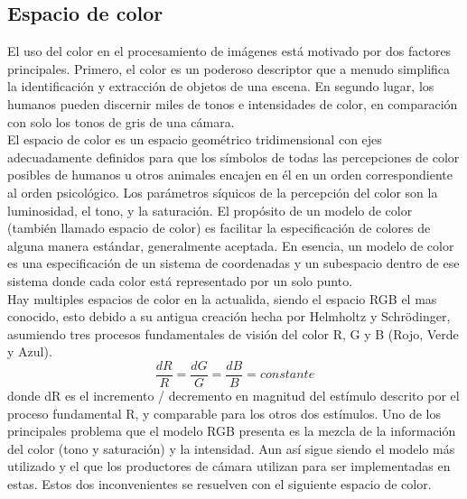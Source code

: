 \subsection{Espacio de color}
El uso del color en el procesamiento de imágenes está motivado por dos factores principales.
Primero, el color es un poderoso descriptor que a menudo simplifica la identificación y
extracción de objetos de una escena. En segundo lugar, los humanos pueden discernir miles
de tonos e intensidades de color, en comparación con solo los tonos de gris de una cámara.\cite{Book:Rafael2002}\\
El espacio de color es un espacio geométrico tridimensional con ejes adecuadamente
definidos para que los símbolos de todas las percepciones de color posibles de humanos u
otros animales encajen en él en un orden correspondiente al orden psicológico.
Los parámetros síquicos de la percepción del color son la luminosidad, el tono, y
la saturación. El propósito de un modelo de color (también llamado espacio de color) es
facilitar la especificación de colores de alguna manera estándar, generalmente aceptada.
En esencia, un modelo de color es una especificación de un sistema de coordenadas y un
subespacio dentro de ese sistema donde cada color está representado por un solo punto.\\
Hay multiples espacios de color en la actualida, siendo el espacio RGB el mas conocido, esto
debido a su antigua creación hecha por Helmholtz y Schrödinger, asumiendo
tres procesos fundamentales de visión del color R, G y B (Rojo, Verde y Azul).
\begin{equation}
	\frac{dR}{R} = \frac{dG}{G} = \frac{dB}{B} = constante
\end{equation}
donde dR es el incremento / decremento en magnitud del estímulo descrito por el proceso
fundamental R, y comparable para los otros dos estímulos.\cite{Book:Rolf2003}
Uno de los principales problema que el modelo RGB presenta es la mezcla de la información
del color (tono y saturación) y la intensidad. Aun así sigue siendo el modelo más utilizado y
el que los productores de cámara utilizan para ser implementadas en estas. Estos dos inconvenientes
se resuelven con el siguiente espacio de color.
